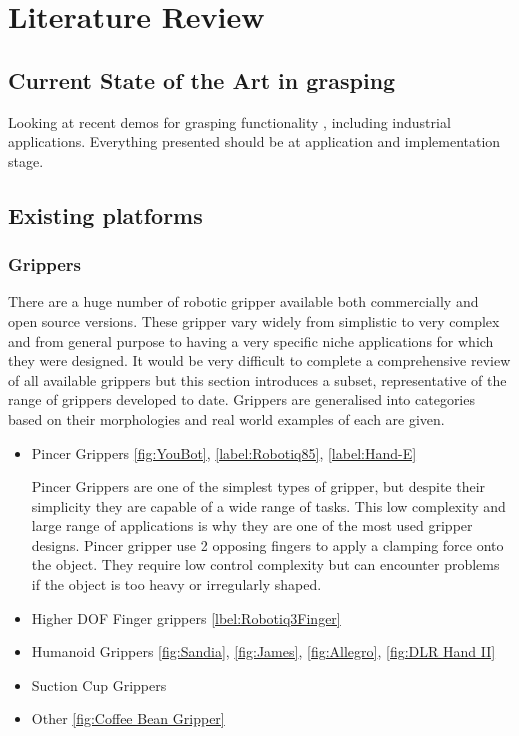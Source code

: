 \chapter{Literature Review}



\section{Current State of the Art in grasping} %
Looking at recent demos for grasping functionality , including industrial applications. Everything presented should be at application and implementation stage.

\section{Existing platforms}

\subsection{Grippers}
There are a huge number of robotic gripper available both commercially and open source versions. These gripper vary widely from simplistic to very complex and from general purpose to having a very specific niche applications for which they were designed. It would be very difficult to complete a comprehensive review of all available grippers but this section introduces a subset, representative of the range of grippers developed to date. Grippers are generalised into categories based on their morphologies and real world examples of each are given.

\begin{itemize}
    \item Pincer Grippers \ref{fig:YouBot}, \ref{label:Robotiq85}, \ref{label:Hand-E}
    
    Pincer Grippers are one of the simplest types of gripper, but despite their simplicity they are capable of a wide range of tasks. This low complexity and large range of applications is why they are one of the most used gripper designs. Pincer gripper use 2 opposing fingers to apply a clamping force onto the object. They require low control complexity but can encounter problems if the object is too heavy or irregularly shaped.
    
    \item Higher DOF Finger grippers \ref{lbel:Robotiq3Finger}
    \item Humanoid Grippers \ref{fig:Sandia}, \ref{fig:James}, \ref{fig:Allegro}, \ref{fig:DLR Hand II}
    \item Suction Cup Grippers
    \item Other \ref{fig:Coffee Bean Gripper}
\end{itemize}

